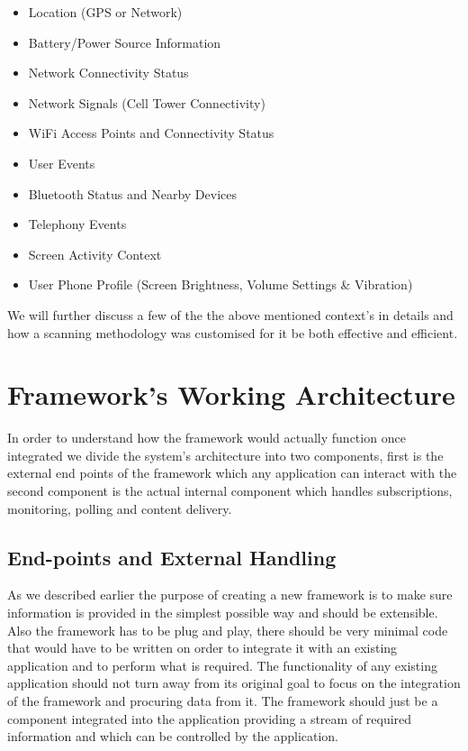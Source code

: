 \documentclass[12pt]{report}
\begin{document}
\begin{itemize}
\item Location (GPS or Network)
\item Battery/Power Source Information
\item Network Connectivity Status
\item Network Signals (Cell Tower Connectivity)
\item WiFi Access Points and Connectivity Status
\item User Events
\item Bluetooth Status and Nearby Devices
\item Telephony Events
\item Screen Activity Context
\item User Phone Profile (Screen Brightness, Volume Settings \& Vibration)
\end{itemize}

We will further discuss a few of the the above mentioned context's in details and how a scanning methodology was customised for it be both effective and efficient.
 
\section{Framework's Working Architecture}

In order to understand how the framework would actually function once integrated we divide the system's architecture into two components, first is the external end points of the framework which any application can interact with the second component is the actual internal component which handles subscriptions, monitoring, polling and content delivery.

\subsection{End-points and External Handling}
\label{ExternalHandling}

As we described earlier the purpose of creating a new framework is to make sure information is provided in the simplest possible way and should be extensible. Also the framework has to be plug and play, there should be very minimal code that would have to be written on order to integrate it with an existing application and to perform what is required. The functionality of any existing application should not turn away from its original goal to focus on the integration of the framework and procuring data from it. The framework should just be a component integrated into the application providing a stream of required information and which can be controlled by the application.
\end{document}
